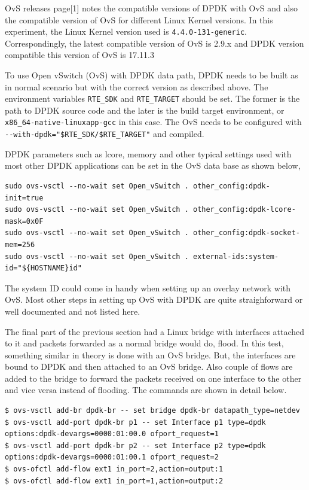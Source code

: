 \documentclass[english, 12pt, a4paper, elec, utf8, a-1b, online]{aaltothesis}
\begin{document}
OvS releases page[1] notes the compatible versions of DPDK with OvS and also the compatible version of OvS for different Linux Kernel versions. In this experiment, the Linux Kernel version used is \lstinline{4.4.0-131-generic}. Correspondingly, the latest compatible version of OvS is 2.9.x and DPDK version compatible this version of OvS is 17.11.3

To use Open vSwitch (OvS) with DPDK data path, DPDK needs to be built as in normal scenario but with the correct version as described above. The environment variables \lstinline{RTE_SDK} and \lstinline{RTE_TARGET} should be set. The former is the path to DPDK source code and the later is the build target environment, or \lstinline{x86_64-native-linuxapp-gcc} in this case. The OvS needs to be configured with \lstinline{--with-dpdk="$RTE_SDK/$RTE_TARGET"} and compiled.

DPDK parameters such as lcore, memory and other typical settings used with most other DPDK applications can be set in the OvS data base as shown below,

\begin{lstlisting}[basicstyle={\small\ttfamily}]
sudo ovs-vsctl --no-wait set Open_vSwitch . other_config:dpdk-init=true
sudo ovs-vsctl --no-wait set Open_vSwitch . other_config:dpdk-lcore-mask=0x0F
sudo ovs-vsctl --no-wait set Open_vSwitch . other_config:dpdk-socket-mem=256
sudo ovs-vsctl --no-wait set Open_vSwitch . external-ids:system-id="${HOSTNAME}id"
\end{lstlisting}

The system ID could come in handy when setting up an overlay network with OvS. Most other steps in setting up OvS with DPDK are quite straighforward or well documented and not listed here.

The final part of the previous section had a Linux bridge with interfaces attached to it and packets forwarded as a normal bridge would do, flood. In this test, something similar in theory is done with an OvS bridge. But, the interfaces are bound to DPDK and then attached to an OvS bridge. Also couple of flows are added to the bridge to forward the packets received on one interface to the other and vice versa instead of flooding. The commands are shown in detail below.

\begin{lstlisting}[basicstyle={\small\ttfamily}]
$ ovs-vsctl add-br dpdk-br -- set bridge dpdk-br datapath_type=netdev
$ ovs-vsctl add-port dpdk-br p1 -- set Interface p1 type=dpdk options:dpdk-devargs=0000:01:00.0 ofport_request=1
$ ovs-vsctl add-port dpdk-br p2 -- set Interface p2 type=dpdk options:dpdk-devargs=0000:01:00.1 ofport_request=2
$ ovs-ofctl add-flow ext1 in_port=2,action=output:1
$ ovs-ofctl add-flow ext1 in_port=1,action=output:2
\end{lstlisting}
\end{document}
